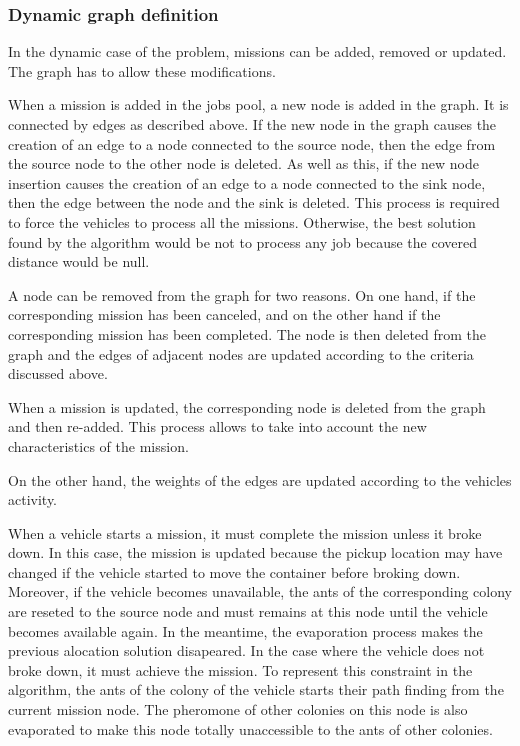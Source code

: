 \documentclass[a4paper,10pt]{article}
\begin{document}
\subsubsection{Dynamic graph definition}
In the dynamic case of the problem, missions can be added, removed or updated. The graph has to allow these modifications.

When a mission is added in the jobs pool, a new node is added in the graph. It is connected by edges as described above. If the new node in the graph causes the creation of an edge to a node connected to the source node, then the edge from the source node to the other node is deleted. As well as this, if the new node insertion causes the creation of an edge to a node connected to the sink node, then the edge between the node and the sink is deleted. This process is required to force the vehicles to process all the missions. Otherwise, the best solution found by the algorithm would be not to process any job because the covered distance would be null.


A node can be removed from the graph for two reasons. On one hand, if the corresponding mission has been canceled, and on the other hand if the corresponding mission has been completed. The node is then deleted from the graph and the edges of adjacent nodes are updated according to the criteria discussed above.


When a mission is updated, the corresponding node is deleted from the graph and then re-added. This process allows to take into account the new characteristics of the mission.

On the other hand, the weights of the edges are updated according to the vehicles activity.

When a vehicle starts a mission, it must complete the mission unless it broke down. In this case, the mission is updated because the pickup location may have changed if the vehicle started to move the container before broking down. Moreover, if the vehicle becomes unavailable, the ants of the corresponding colony are reseted to the source node and must remains at this node until the vehicle becomes available again. In the meantime, the evaporation process makes the previous alocation solution disapeared.
In the case where the vehicle does not broke down, it must achieve the mission. To represent this constraint in the algorithm, the ants of the colony of the vehicle starts their path finding from the current mission node. The pheromone of other colonies on this node is also evaporated to make this node totally unaccessible to the ants of other colonies.
\end{document}

